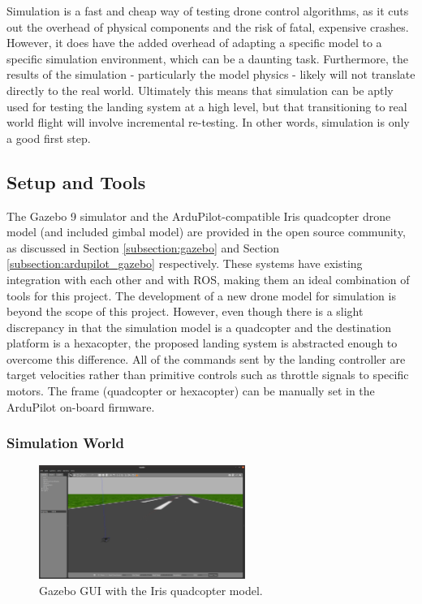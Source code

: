 Simulation is a fast and cheap way of testing drone control algorithms, as it cuts out the overhead of physical components and the risk of fatal, expensive crashes. However, it does have the added overhead of adapting a specific model to a specific simulation environment, which can be a daunting task. Furthermore, the results of the simulation - particularly the model physics - likely will not translate directly to the real world. Ultimately this means that simulation can be aptly used for testing the landing system at a high level, but that transitioning to real world flight will involve incremental re-testing. In other words, simulation is only a good first step.


\subsection{Setup and Tools}
\label{subsection:setup_and_tools}

The Gazebo 9 simulator and the ArduPilot-compatible Iris quadcopter drone model (and included gimbal model) are provided in the open source community, as discussed in Section \ref{subsection:gazebo} and Section \ref{subsection:ardupilot_gazebo} respectively. These systems have existing integration with each other and with \gls{ROS}, making them an ideal combination of tools for this project. The development of a new drone model for simulation is beyond the scope of this project. However, even though there is a slight discrepancy in that the simulation model is a quadcopter and the destination platform is a hexacopter, the proposed landing system is abstracted enough to overcome this difference. All of the commands sent by the landing controller are target velocities rather than primitive controls such as throttle signals to specific motors. The frame (quadcopter or hexacopter) can be manually set in the ArduPilot on-board firmware.


\subsubsection{Simulation World}

\begin{figure}[ht]
    \centering
    \includegraphics[width=0.6\textwidth]{images/gazebo.png}
    \caption{Gazebo GUI with the Iris quadcopter model.}
    \label{fig:gazebo}
\end{figure}

